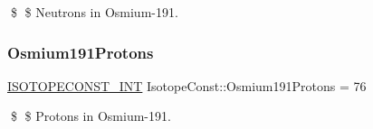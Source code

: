 \$ \$ Neutrons in Osmium-\/191. \mbox{\label{group___isotope_const-_osmium-_os191_ga0d92d3e11b6e7a59638a4e1aa3d33142}} 
\subsubsection{\texorpdfstring{Osmium191\+Protons}{Osmium191Protons}}
{\footnotesize\ttfamily \mbox{\hyperlink{group___isotope_const-_macros_ga5f18360b3e99483a35c32d789e62621c}{I\+S\+O\+T\+O\+P\+E\+C\+O\+N\+S\+T\+\_\+\+I\+NT}} Isotope\+Const\+::\+Osmium191\+Protons = 76}

\$ \$ Protons in Osmium-\/191. 